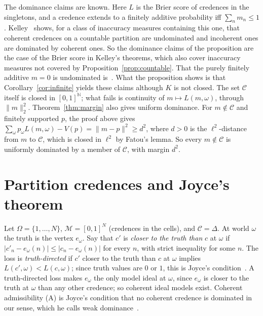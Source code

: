 \documentclass[11pt]{article}
\theoremstyle{definition}
\theoremstyle{remark}
\newcommand{\M}{\mathcal M}
\newcommand{\C}{\mathcal C}
\begin{document}
The dominance claims are known. Here $L$ is the Brier score of credences in the singletons, and a credence extends to a finitely additive probability iff $\sum_nm_n\le1$. Kelley~\cite[Theorems 3.4 and 4.26]{Kelley} shows, for a class of inaccuracy measures containing this one, that coherent credences on a countable partition are undominated and incoherent ones are dominated by coherent ones. So the dominance claims of the proposition are the case of the Brier score in Kelley's theorems, which also cover inaccuracy measures not covered by Proposition~\ref{prop:countable}. That the purely finitely additive $m=0$ is undominated is~\cite[Example~3]{SSK14}. What the proposition shows is that Corollary~\ref{cor:infinite} yields these claims although $K$ is not closed. The set $\C$ itself is closed in $[0,1]^{\mathbb N}$; what fails is continuity of $m\mapsto L(m,\omega)$, through $\|m\|_2^2$. Theorem~\ref{thm:margin} also gives uniform dominance. For $m\notin\C$ and finitely supported $p$, the proof above gives $\sum_\omega p_\omega L(m,\omega)-V(p)=\|m-p\|^2\ge d^2$, where $d>0$ is the $\ell^2$-distance from $m$ to $\C$, which is closed in $\ell^2$ by Fatou's lemma. So every $m\notin\C$ is uniformly dominated by a member of $\C$, with margin $d^2$.

\section{Partition credences and Joyce's theorem}\label{sec:joyce}
Let $\Omega=\{1,\dots,N\}$, $\M=[0,1]^N$ (credences in the cells), and $\C=\Delta$. At world $\omega$ the truth is the vertex $e_\omega$. Say that $c'$ is \emph{closer to the truth than} $c$ at $\omega$ if $|c'_n-e_\omega(n)|\le|c_n-e_\omega(n)|$ for every $n$, with strict inequality for some $n$. The loss is \emph{truth-directed} if $c'$ closer to the truth than $c$ at $\omega$ implies $L(c',\omega)<L(c,\omega)$; since truth values are $0$ or $1$, this is Joyce's condition~\cite[p.~269]{Joyce}. A truth-directed loss makes $e_\omega$ the only model ideal at $\omega$, since $e_\omega$ is closer to the truth at $\omega$ than any other credence; so coherent ideal models exist. Coherent admissibility (A) is Joyce's condition that no coherent credence is dominated in our sense, which he calls weak dominance~\cite[pp.~267, 280]{Joyce}.
\end{document}
